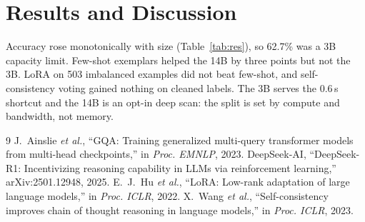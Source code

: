 \documentclass[conference,10pt]{IEEEtran}
\begin{document}
\section{Results and Discussion}
Accuracy rose monotonically with size (Table~\ref{tab:res}), so 62.7\% was a 3B capacity limit. Few-shot exemplars helped the 14B by three points but not the 3B. LoRA \cite{lora} on 503 imbalanced examples did not beat few-shot, and self-consistency voting \cite{sc} gained nothing on cleaned labels. The 3B serves the 0.6\,s shortcut and the 14B is an opt-in deep scan: the split is set by compute and bandwidth, not memory.

\vspace{-2pt}
\begin{thebibliography}{9}
\scriptsize
\setlength{\itemsep}{0pt}
 J.~Ainslie \emph{et al.}, ``GQA: Training generalized multi-query transformer models from multi-head checkpoints,'' in \emph{Proc. EMNLP}, 2023.
 DeepSeek-AI, ``DeepSeek-R1: Incentivizing reasoning capability in LLMs via reinforcement learning,'' arXiv:2501.12948, 2025.
 E.~J.~Hu \emph{et al.}, ``LoRA: Low-rank adaptation of large language models,'' in \emph{Proc. ICLR}, 2022.
 X.~Wang \emph{et al.}, ``Self-consistency improves chain of thought reasoning in language models,'' in \emph{Proc. ICLR}, 2023.
\end{thebibliography}
\end{document}
